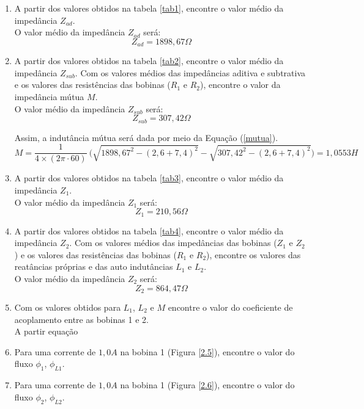 \documentclass[a4paper,12pt,oneside,openany,table,xcdraw]{article}
\begin{document}
\begin{enumerate}[1 - ]
\item A partir dos valores obtidos na tabela \ref{tab1}, encontre o valor médio da impedância $Z_{ad}$.\\
O valor médio da impedância $Z_{ad}$ será:
$$Z_{ad}=1898,67\Omega$$

\item A partir dos valores obtidos na tabela \ref{tab2}, encontre o valor médio da impedância $Z_{sub}$.
Com os valores médios das impedâncias aditiva e subtrativa e os valores das resistências das
bobinas ($R_1$ e $R_2$), encontre o valor da impedância mútua $M$. \\
O valor médio da impedância $Z_{sub}$ será:
$$Z_{sub}=307,42\Omega$$

Assim, a indutância mútua será dada por meio da Equação (\ref{mutua}).
\begin{equation*}
M = \dfrac{1}{4\times(2\pi \cdot 60)}\ \bigg(\sqrt{1898,67^2-(2,6+7,4)^2} - \sqrt{307,42^2-(2,6+7,4)^2}\bigg) = 1,0553 H
\end{equation*}


\item A partir dos valores obtidos na tabela \ref{tab3}, encontre o valor médio da impedância $Z_1$.\\
O valor médio da impedância $Z_{1}$ será:
$$Z_{1}=210,56\Omega$$

\item A partir dos valores obtidos na tabela \ref{tab4}, encontre o valor médio da impedância $Z_2$.
Com os valores médios das impedâncias das bobinas ($Z_1$ e $Z_2$) e os valores das resistências
das bobinas ($R_1$ e $R_2$), encontre os valores das reatâncias próprias e das auto indutâncias $L_1$
e $L_2$.\\
O valor médio da impedância $Z_{2}$ será:
$$Z_{2}=864,47\Omega$$



\item Com os valores obtidos para $L_1$, $L_2$ e $M$ encontre o valor do coeficiente de acoplamento
entre as bobinas 1 e 2. \\
A partir equação

\item Para uma corrente de $1,0 A$ na bobina 1 (Figura \ref{2.5}), encontre o valor do fluxo $\phi_1$, $\phi_{L1}$. \\
\item Para uma corrente de $1,0 A$ na bobina 1 (Figura \ref{2.6}), encontre o valor do fluxo $\phi_2$, $\phi_{L2}$. \\


\end{enumerate}
\end{document}
